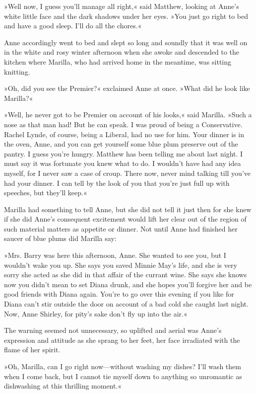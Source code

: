 »Well now, I guess you’ll manage all right,« said Matthew, looking at Anne’s white little face and the dark shadows under her eyes. »You just go right to bed and have a good sleep. I’ll do all the chores.«

Anne accordingly went to bed and slept so long and soundly that it was well on in the white and rosy winter afternoon when she awoke and descended to the kitchen where Marilla, who had arrived home in the meantime, was sitting knitting.

»Oh, did you see the Premier?« exclaimed Anne at once. »What did he look like Marilla?«

»Well, he never got to be Premier on account of his looks,« said Marilla. »Such a nose as that man had! But he can speak. I was proud of being a Conservative. Rachel Lynde, of course, being a Liberal, had no use for him. Your dinner is in the oven, Anne, and you can get yourself some blue plum preserve out of the pantry. I guess you’re hungry. Matthew has been telling me about last night. I must say it was fortunate you knew what to do. I wouldn’t have had any idea myself, for I never saw a case of croup. There now, never mind talking till you’ve had your dinner. I can tell by the look of you that you’re just full up with speeches, but they’ll keep.«

Marilla had something to tell Anne, but she did not tell it just then for she knew if she did Anne’s consequent excitement would lift her clear out of the region of such material matters as appetite or dinner. Not until Anne had finished her saucer of blue plums did Marilla say:

»Mrs. Barry was here this afternoon, Anne. She wanted to see you, but I wouldn’t wake you up. She says you saved Minnie May’s life, and she is very sorry she acted as she did in that affair of the currant wine. She says she knows now you didn’t mean to set Diana drunk, and she hopes you’ll forgive her and be good friends with Diana again. You’re to go over this evening if you like for Diana can’t stir outside the door on account of a bad cold she caught last night. Now, Anne Shirley, for pity’s sake don’t fly up into the air.«

The warning seemed not unnecessary, so uplifted and aerial was Anne’s expression and attitude as she sprang to her feet, her face irradiated with the flame of her spirit.

»Oh, Marilla, can I go right now—without washing my dishes? I’ll wash them when I come back, but I cannot tie myself down to anything so unromantic as dishwashing at this thrilling moment.«

